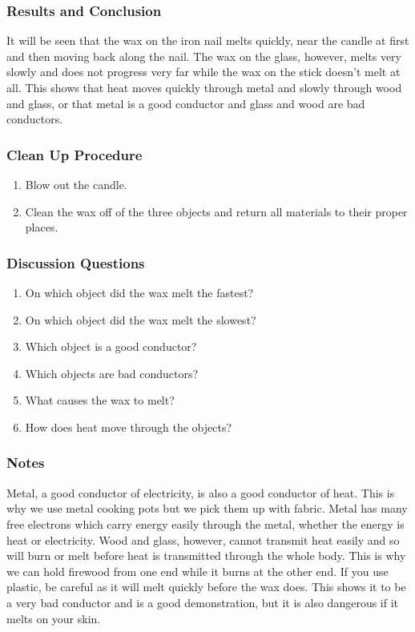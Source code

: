 \subsubsection*{Results and Conclusion}
It will be seen that the wax on the iron nail melts quickly, near the candle at first and then moving back along the nail. The wax on the glass, however, melts very slowly and does not progress very far while the wax on the stick doesn't melt at all.  
This shows that heat moves quickly through metal and slowly through wood and glass, or that metal is a good conductor and glass and wood are bad conductors.  

\subsubsection*{Clean Up Procedure}
\begin{enumerate}
\item{Blow out the candle.} 
\item{Clean the wax off of the three objects and return all materials to their proper places.} 
\end{enumerate}

\subsubsection*{Discussion Questions}
\begin{enumerate}
\item{On which object did the wax melt the fastest?}
\item{On which object did the wax melt the slowest?}
\item{Which object is a good conductor?}
\item{Which objects are bad conductors?}
\item{What causes the wax to melt?}
\item{How does heat move through the objects?}
\end{enumerate}

\subsubsection*{Notes}
Metal, a good conductor of electricity, is also a good conductor of heat. This is why we use metal cooking pots but we pick them up with fabric. Metal has many free electrons which carry energy easily through the metal, whether the energy is heat or electricity. Wood and glass, however, cannot transmit heat easily and so will burn or melt before heat is transmitted through the whole body. This is why we can hold firewood from one end while it burns at the other end.  
If you use plastic, be careful as it will melt quickly before the wax does. This shows it to be a very bad conductor and is a good demonstration, but it is also dangerous if it melts on your skin.  


